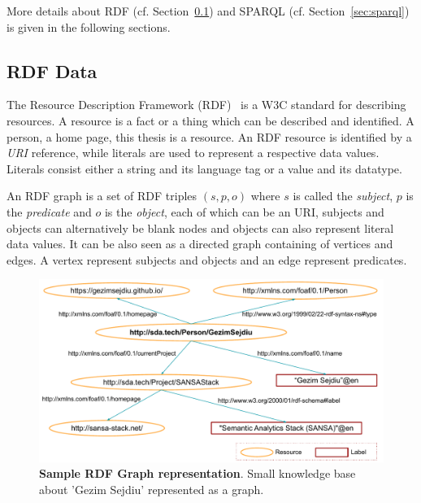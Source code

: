 More details about \gls{RDF} (cf. Section~\ref{sec:rdf-data}) and \gls{SPARQL} (cf. Section~\ref{sec:sparql}) is given in the following sections.
\addtocounter{footnote}{-1}


\subsection{RDF Data}
\label{sec:rdf-data}

The Resource Description Framework (\gls{RDF})~\cite{Wood:14:RCA} is a \gls{W3C} standard for describing resources.
A resource is a fact or a thing which can be described and identified. 
A person, a home page, this thesis is a resource. 
An RDF resource is identified by a \emph{\gls{URI}} reference, while literals are used to represent a respective data values.
Literals consist either a string and its language tag or a value and its datatype.

An \gls{RDF} graph is a set of \gls{RDF} triples $(s,p,o)$ where $s$ is called the \emph{subject}, $p$ is the \emph{predicate} and $o$ is the \emph{object}, each of which can be an \gls{URI}, subjects and objects can alternatively be blank nodes and objects can also represent literal data values.
It can be also seen as a directed graph containing of vertices and edges. 
A vertex represent subjects and objects and an edge represent predicates.

\begin{figure}
\centering
\includegraphics[width=1.0\columnwidth]{images/2_preliminaries/rdf-triple-example.pdf}
 \caption{\textbf{Sample RDF Graph representation}. Small knowledge base about 'Gezim Sejdiu' represented as a graph.}
\label{fig:preliminaries-rdf-graph-sample}
\end{figure}


